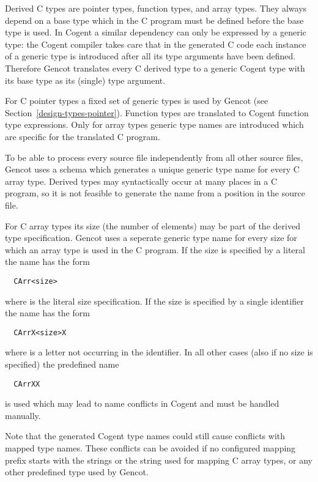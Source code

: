 Derived C types are pointer types, function types, and array types. They always depend on a base type which in the C program 
must be defined before the base type is used.
In Cogent a similar dependency can only be expressed by a generic type: the Cogent compiler takes care that in the generated C code
each instance
of a generic type is introduced after all its type arguments have been defined. Therefore Gencot translates every C derived
type to a generic Cogent type with its base type as its (single) type argument.

For C pointer types a fixed set of generic types is used by Gencot (see Section~\ref{design-types-pointer}). Function types 
are translated to Cogent function type expressions. Only for array types generic type names are introduced which are specific
for the translated C program.

To be able to process every source file independently from all other source files, Gencot uses a schema which generates
a unique generic type name for every C array type. Derived types may syntactically occur at many places in a C program, so
it is not feasible to generate the name from a position in the source file.

For C array types its size (the number of elements) may be part of the derived type specification. Gencot uses a seperate generic
type name for every size for which an array type is used in the C program. If the size is specified by a literal the name
has the form
\begin{verbatim}
  CArr<size>
\end{verbatim}
where  is the literal size specification. If the size is specified by a single identifier the name has the form
\begin{verbatim}
  CArrX<size>X
\end{verbatim}
where  is a letter not occurring in the identifier.
In all other cases (also if no size is specified) the predefined name
\begin{verbatim}
  CArrXX
\end{verbatim}
is used which may lead to name conflicts in Cogent and must be handled manually. 

Note that the generated Cogent type names could still cause conflicts with mapped type names. These conflicts can be
avoided if no configured mapping prefix starts with the  strings
or the string  used for mapping C array types, or any other predefined type used by Gencot.
